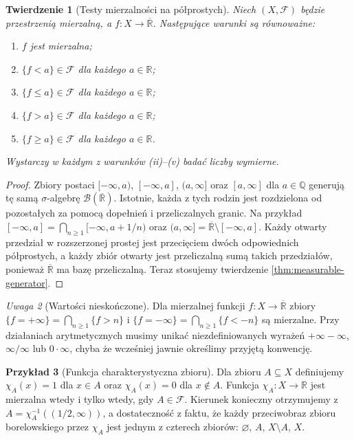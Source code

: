 \documentclass[11pt,a4paper,oneside]{book}
\numberwithin{equation}{chapter}
\theoremstyle{plain}
\newtheorem{twierdzenie}{Twierdzenie}[chapter]
\theoremstyle{definition}
\newtheorem{przyklad}[twierdzenie]{Przykład}
\theoremstyle{remark}
\newtheorem{uwaga}[twierdzenie]{Uwaga}
\begin{document}
\begin{twierdzenie}[Testy mierzalności na półprostych]
\label{thm:extended-tests}
Niech $(X,\mathcal F)$ będzie przestrzenią mierzalną,
a $f:X\to\overline{\mathbb R}$. Następujące warunki są równoważne:
\begin{enumerate}[label=\textup{(\roman*)}]
\item $f$ jest mierzalna;
\item $\{f<a\}\in\mathcal F$ dla każdego $a\in\mathbb R$;
\item $\{f\le a\}\in\mathcal F$ dla każdego $a\in\mathbb R$;
\item $\{f>a\}\in\mathcal F$ dla każdego $a\in\mathbb R$;
\item $\{f\ge a\}\in\mathcal F$ dla każdego $a\in\mathbb R$.
\end{enumerate}
Wystarczy w każdym z warunków (ii)--(v) badać liczby wymierne.
\end{twierdzenie}
\begin{proof}
Zbiory postaci $[-\infty,a)$, $[-\infty,a]$,
$(a,\infty]$ oraz $[a,\infty]$ dla $a\in\mathbb Q$
generują tę samą $\sigma$-algebrę
$\mathcal B(\overline{\mathbb R})$. Istotnie, każda
z tych rodzin jest rozdzielona od pozostałych za pomocą
dopełnień i przeliczalnych granic. Na przykład
$[-\infty,a]=\bigcap_{n\ge1}[-\infty,a+1/n)$ oraz
$(a,\infty]=\overline{\mathbb R}\setminus[-\infty,a]$.
Każdy otwarty przedział w rozszerzonej prostej
jest przecięciem dwóch odpowiednich półprostych,
a każdy zbiór otwarty jest przeliczalną sumą takich
przedziałów, ponieważ $\overline{\mathbb R}$ ma bazę
przeliczalną. Teraz stosujemy twierdzenie
\ref{thm:measurable-generator}.
\end{proof}

\begin{uwaga}[Wartości nieskończone]
Dla mierzalnej funkcji $f:X\to\overline{\mathbb R}$
zbiory $\{f=+\infty\}=\bigcap_{n\ge1}\{f>n\}$ i
$\{f=-\infty\}=\bigcap_{n\ge1}\{f<-n\}$ są mierzalne.
Przy działaniach arytmetycznych musimy unikać
niezdefiniowanych wyrażeń $+\infty-\infty$,
$\infty/\infty$ lub $0\cdot\infty$, chyba że wcześniej
jawnie określimy przyjętą konwencję.
\end{uwaga}

\begin{przyklad}[Funkcja charakterystyczna zbioru]
\label{ex:indicator-measurable}
Dla zbioru $A\subseteq X$ definiujemy
$\chi_A(x)=1$ dla $x\in A$ oraz
$\chi_A(x)=0$ dla $x\notin A$.
Funkcja $\chi_A:X\to\mathbb R$ jest mierzalna
wtedy i tylko wtedy, gdy $A\in\mathcal F$.
Kierunek konieczny otrzymujemy z
$A=\chi_A^{-1}((1/2,\infty))$, a dostateczność
z faktu, że każdy przeciwobraz zbioru borelowskiego
przez $\chi_A$ jest jednym z czterech zbiorów:
$\varnothing$, $A$, $X\setminus A$, $X$.
\end{przyklad}
\end{document}
